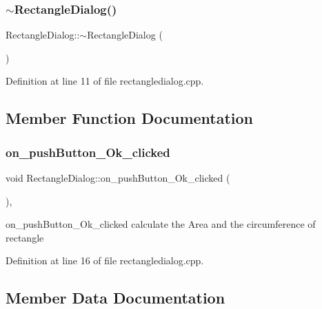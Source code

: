 \subsubsection{\texorpdfstring{$\sim$\+Rectangle\+Dialog()}{~RectangleDialog()}}
{\footnotesize\ttfamily Rectangle\+Dialog\+::$\sim$\+Rectangle\+Dialog (\begin{DoxyParamCaption}{ }\end{DoxyParamCaption})}



Definition at line 11 of file rectangledialog.\+cpp.



\subsection{Member Function Documentation}
\mbox{\label{class_rectangle_dialog_a1f4ec776eedd80298bbe6c6f408027c9}} 
\subsubsection{\texorpdfstring{on\+\_\+push\+Button\+\_\+\+Ok\+\_\+clicked}{on\_pushButton\_Ok\_clicked}}
{\footnotesize\ttfamily void Rectangle\+Dialog\+::on\+\_\+push\+Button\+\_\+\+Ok\+\_\+clicked (\begin{DoxyParamCaption}{ }\end{DoxyParamCaption})\hspace{0.3cm}{\ttfamily [private]}, {\ttfamily [slot]}}



on\+\_\+push\+Button\+\_\+\+Ok\+\_\+clicked calculate the Area and the circumference of rectangle 



Definition at line 16 of file rectangledialog.\+cpp.



\subsection{Member Data Documentation}
\mbox{\label{class_rectangle_dialog_ab65a306d815eaca0c8ff6674f49aea99}} 
